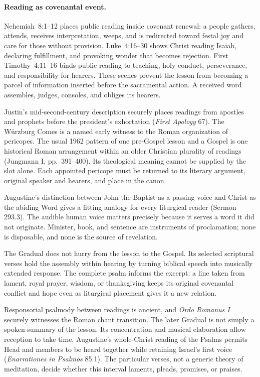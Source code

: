 \paragraph{Reading as covenantal event.}
Nehemiah~8:1--12 places public reading inside covenant renewal: a people gathers, attends, receives interpretation, weeps, and is redirected toward festal joy and care for those without provision. Luke~4:16--30 shows Christ reading Isaiah, declaring fulfillment, and provoking wonder that becomes rejection. First Timothy~4:11--16 binds public reading to teaching, holy conduct, perseverance, and responsibility for hearers. These scenes prevent the lesson from becoming a parcel of information inserted before the sacramental action. A received word assembles, judges, consoles, and obliges its hearers.

Justin's mid-second-century description securely places readings from apostles and prophets before the president's exhortation (\emph{First Apology} 67). The Würzburg Comes is a named early witness to the Roman organization of pericopes. The usual 1962 pattern of one pre-Gospel lesson and a Gospel is one historical Roman arrangement within an older Christian plurality of readings (Jungmann I, pp.~391--400). Its theological meaning cannot be supplied by the slot alone. Each appointed pericope must be returned to its literary argument, original speaker and hearers, and place in the canon.

Augustine's distinction between John the Baptist as a passing voice and Christ as the abiding Word gives a fitting analogy for every liturgical reader (Sermon 293.3). The audible human voice matters precisely because it serves a word it did not originate. Minister, book, and sentence are instruments of proclamation; none is disposable, and none is the source of revelation.


The Gradual does not hurry from the lesson to the Gospel. Its selected scriptural verses hold the assembly within hearing by turning biblical speech into musically extended response. The complete psalm informs the excerpt: a line taken from lament, royal prayer, wisdom, or thanksgiving keeps its original covenantal conflict and hope even as liturgical placement gives it a new relation.

Responsorial psalmody between readings is ancient, and \emph{Ordo Romanus I} securely witnesses the Roman chant transition. The later Gradual is not simply a spoken summary of the lesson. Its concentration and musical elaboration allow reception to take time. Augustine's whole-Christ reading of the Psalms permits Head and members to be heard together while retaining Israel's first voice (\emph{Enarrationes in Psalmos} 85.1). The particular verses, not a generic theory of meditation, decide whether this interval laments, pleads, promises, or praises.

